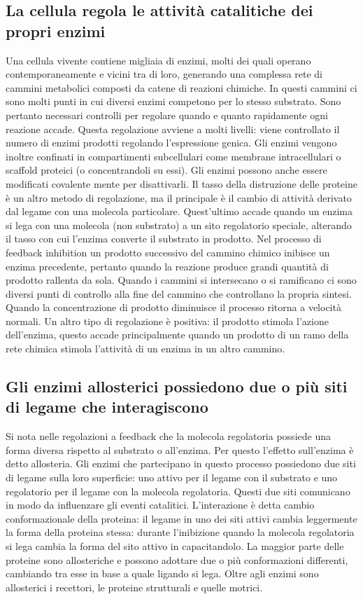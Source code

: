 \subsection{La cellula regola le attivit\`a catalitiche dei propri enzimi}
Una cellula vivente contiene migliaia di enzimi, molti dei quali operano contemporaneamente e vicini tra di loro, generando una complessa rete di cammini metabolici composti da catene
di reazioni chimiche. In questi cammini ci sono molti punti in cui diversi enzimi competono per lo stesso substrato. Sono pertanto necessari controlli per regolare quando e quanto 
rapidamente ogni reazione accade. Questa regolazione avviene a molti livelli: viene controllato il numero di enzimi prodotti regolando l'espressione genica. Gli enzimi vengono inoltre
confinati in compartimenti subcellulari come membrane intracellulari o scaffold proteici (o concentrandoli su essi). Gli enzimi possono anche essere modificati covalente mente per 
disattivarli. Il tasso della distruzione delle proteine \`e un altro metodo di regolazione, ma il principale \`e il cambio di attivit\`a derivato dal legame con una molecola particolare.
Quest'ultimo accade quando un enzima si lega con una molecola (non substrato) a un sito regolatorio speciale, alterando il tasso con cui l'enzima converte il substrato in prodotto. Nel
processo di feedback inhibition un prodotto successivo del cammino chimico inibisce un enzima precedente, pertanto quando la reazione produce grandi quantit\`a di prodotto rallenta da 
sola. Quando i cammini si intersecano o si ramificano ci sono diversi punti di controllo alla fine del cammino che controllano la propria sintesi. Quando la concentrazione di prodotto
diminuisce il processo ritorna a velocit\`a normali. Un altro tipo di regolazione \`e positiva: il prodotto stimola l'azione dell'enzima, questo accade principalmente quando un prodotto
di un ramo della rete chimica stimola l'attivit\`a di un enzima in un altro cammino. 
\subsection{Gli enzimi allosterici possiedono due o pi\`u siti di legame che interagiscono}
Si nota nelle regolazioni a feedback che la molecola regolatoria possiede una forma diversa rispetto al substrato o all'enzima. Per questo l'effetto sull'enzima \`e detto allosteria. 
Gli enzimi che partecipano in questo processo possiedono due siti di legame sulla loro superficie: uno attivo per il legame con il substrato e uno regolatorio per il legame con la
molecola regolatoria. Questi due siti comunicano in modo da influenzare gli eventi catalitici. L'interazione \`e detta cambio conformazionale della proteina: il legame in uno dei siti
attivi cambia leggermente la forma della proteina stessa: durante l'inibizione quando la molecola regolatoria si lega cambia la forma del sito attivo in capacitandolo. La maggior parte
delle proteine sono allosteriche e possono adottare due o pi\`u conformazioni differenti, cambiando tra esse in base a quale ligando si lega. Oltre agli enzimi sono allosterici i 
recettori, le proteine strutturali e quelle motrici. 
